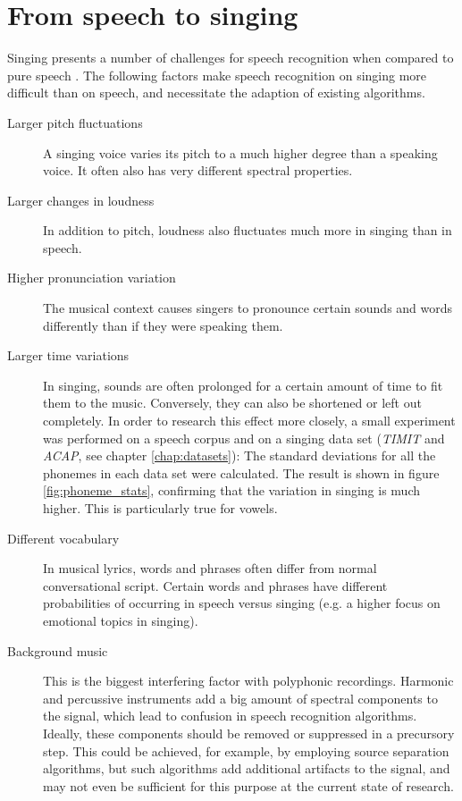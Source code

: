 \section{From speech to singing} \label{sec:sota_speechtosinging}
Singing presents a number of challenges for speech recognition when compared to pure speech \cite{loscos}\cite{goto_alignment}\cite{kruspe_kws1}. The following factors make speech recognition on singing more difficult than on speech, and necessitate the adaption of existing algorithms.
\begin{description}
 \item[Larger pitch fluctuations] A singing voice varies its pitch to a much higher degree than a speaking voice. It often also has very different spectral properties.
 \item[Larger changes in loudness] In addition to pitch, loudness also fluctuates much more in singing than in speech.
 \item[Higher pronunciation variation] The musical context causes singers to pronounce certain sounds and words differently than if they were speaking them.
 \item[Larger time variations] In singing, sounds are often prolonged for a certain amount of time to fit them to the music. Conversely, they can also be shortened or left out completely.
 In order to research this effect more closely, a small experiment was performed on a speech corpus and on a singing data set (\textit{TIMIT} and \textit{ACAP}, see chapter \ref{chap:datasets}): The standard deviations for all the phonemes in each data set were calculated. The result is shown in figure \ref{fig:phoneme_stats}, confirming that the variation in singing is much higher. This is particularly true for vowels.
 \item[Different vocabulary] In musical lyrics, words and phrases often differ from normal conversational script. Certain words and phrases have different probabilities of occurring in speech versus singing (e.g. a higher focus on emotional topics in singing).
 \item[Background music] This is the biggest interfering factor with polyphonic recordings. Harmonic and percussive instruments add a big amount of spectral components to the signal, which lead to confusion in speech recognition algorithms. Ideally, these components should be removed or suppressed in a precursory step. This could be achieved, for example, by employing source separation algorithms, but such algorithms add additional artifacts to the signal, and may not even be sufficient for this purpose at the current state of research.

\end{description}
